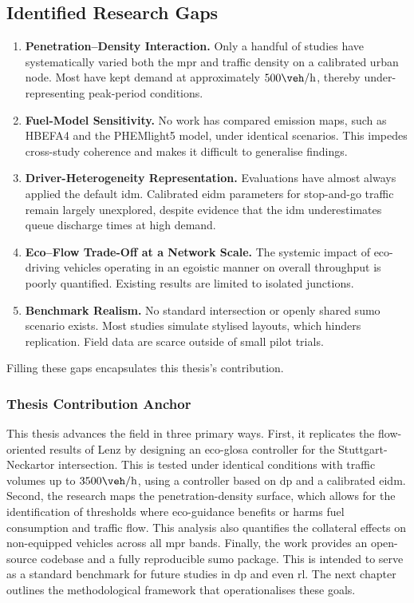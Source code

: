 \subsection{Identified Research Gaps}
\begin{enumerate}[label=\textit{(\roman*)}]
    \item \textbf{Penetration–Density Interaction.} Only a handful of studies have systematically varied both the \ac{mpr} and traffic density on a calibrated urban node. Most have kept demand at approximately $500\unit{\veh\per\hour}$, thereby under-representing peak-period conditions.
    \item \textbf{Fuel-Model Sensitivity.} No work has compared emission maps, such as HBEFA4 and the PHEMlight5 model, under identical scenarios. This impedes cross-study coherence and makes it difficult to generalise findings.
    \item \textbf{Driver-Heterogeneity Representation.} Evaluations have almost always applied the default \ac{idm}. Calibrated \ac{eidm} parameters for stop-and-go traffic remain largely unexplored, despite evidence that the \ac{idm} underestimates queue discharge times at high demand.
    \item \textbf{Eco–Flow Trade-Off at a Network Scale.} The systemic impact of eco-driving vehicles operating in an egoistic manner on overall throughput is poorly quantified. Existing results are limited to isolated junctions.
    \item \textbf{Benchmark Realism.} No standard intersection or openly shared \ac{sumo} scenario exists. Most studies simulate stylised layouts, which hinders replication. Field data are scarce outside of small pilot trials.
\end{enumerate}
Filling these gaps encapsulates this thesis's contribution.

\subsubsection{Thesis Contribution Anchor}
\label{subsubsec:thesis_contribution_anchor}

This thesis advances the field in three primary ways. First, it replicates the flow-oriented results of Lenz \cite{Lenz2024} by designing an \ac{eco-glosa} controller for the Stuttgart-Neckartor intersection. This is tested under identical conditions with traffic volumes up to $3500\unit{\veh\per\hour}$, using a controller based on \ac{dp} and a calibrated \ac{eidm}. Second, the research maps the penetration-density surface, which allows for the identification of thresholds where eco-guidance benefits or harms fuel consumption and traffic flow. This analysis also quantifies the collateral effects on non-equipped vehicles across all \ac{mpr} bands. Finally, the work provides an open-source codebase and a fully reproducible \ac{sumo} package. This is intended to serve as a standard benchmark for future studies in \ac{dp} and even \ac{rl}.
\mynewline
The next chapter outlines the methodological framework that operationalises these goals.